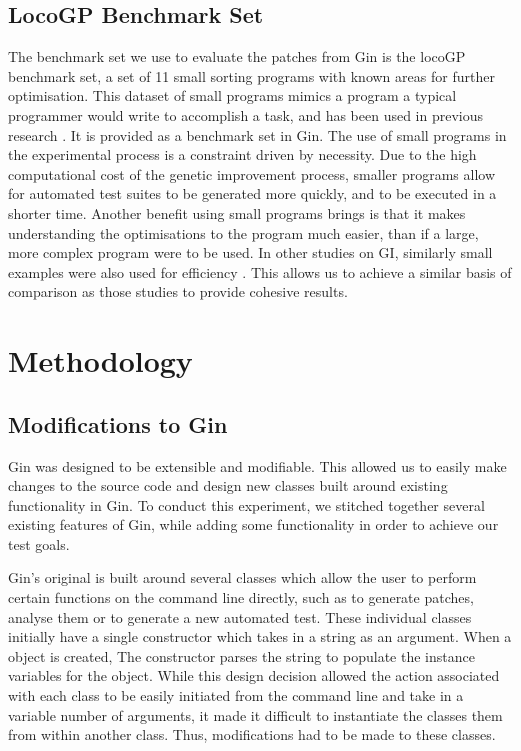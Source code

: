 \documentclass[titlepage]{article}
\begin{document}
\subsection{LocoGP Benchmark Set}
The benchmark set we use to evaluate the patches from Gin is the locoGP \cite{locogp} benchmark set, a set of 11 small sorting programs with known areas for further optimisation. This dataset of small programs mimics a program a typical programmer would write to accomplish a task, and has been used in previous research \cite{locogp}. It is provided as a benchmark set in Gin. 
The use of small programs in the experimental process is a constraint driven by necessity. Due to the high computational cost of the genetic improvement process, smaller programs allow for automated test suites to be generated more quickly, and to be executed in a shorter time. Another benefit using small programs brings is that it makes understanding the optimisations to the program much easier, than if a large, more complex program were to be used. In other studies on GI, similarly small examples were also used for efficiency \cite{cure, souzagouesgenprog2018,gouesrepair2013}. This allows us to achieve a similar basis of comparison as those studies to provide cohesive results.


\section{Methodology}

\subsection{Modifications to Gin}

Gin was designed to be extensible and modifiable. This allowed us to easily make changes to the source code and design new classes built around existing functionality in Gin.
To conduct this experiment, we stitched together several existing features of Gin, while adding some functionality in order to achieve our test goals. 

Gin’s original is built around several classes which allow the user to perform certain functions on the command line directly, such as to generate patches, analyse them or to generate a new automated test. These individual classes initially have a single constructor which takes in a string as an argument. When a object is created, The constructor parses the string to populate the instance variables for the object. While this design decision allowed the action associated with each class to be easily initiated from the command line and take in a variable number of arguments, it made it difficult to instantiate the classes them from within another class. Thus, modifications had to be made to these classes.  
\end{document}
